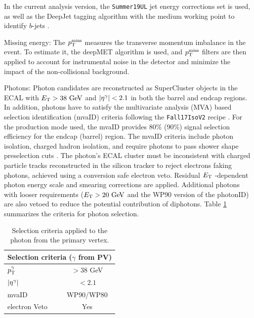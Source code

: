 \begin{myitemlist}
    In the current analysis version, the \verb+Summer19UL+ jet energy corrections set is used, as well as the DeepJet tagging algorithm with the medium working point to identify $b$-jets \cite{Bols:2020bkb}.

    \item[Missing energy:] The $p_\text{T}^{\text{miss}}$ measures the transverse momentum imbalance in the event. To estimate it, the deepMET algorithm \cite{Feng:2744871} is used, and $p_\text{T}^{\text{miss}}$ filters are then applied to account for instrumental noise in the detector and minimize the impact of the non-collisional background.
    
    \item[Photons:] Photon candidates are reconstructed as SuperCluster objects in the ECAL with $E_\text{T} > 38\ \text{GeV}$ and $\left\lvert\eta^{\gamma}\right\rvert < 2.1$ in both the barrel and endcap regions. In addition, photons have to satisfy the multivariate analysis (MVA) based selection identification (mvaID) criteria following the \verb+Fall17IsoV2+ recipe \cite{CMS:2020uim}. For the production mode used, the mvaID provides 80\% (90\%) signal selection efficiency for the endcap (barrel) region. The mvaID criteria include photon isolation, charged hadron isolation, and require photons to pass shower shape preselection cuts \cite{Rembser:2019ijh}. The photon's ECAL cluster must be inconsistent with charged particle tracks reconstructed in the silicon tracker to reject electrons faking photons, achieved using a conversion safe electron veto. Residual $E_\text{T}$ -dependent photon energy scale and smearing corrections are applied. Additional photons with looser requirements ($E_\text{T} > 20\ \text{GeV}$ and the WP90 version of the photonID) are also vetoed to reduce the potential contribution of diphotons. Table \ref{tab:photon_selection} summarizes the criteria for photon selection.

    \begin{table}[!ht]
        \centering
        \begin{tabular}{|l|c|}
            \hline
                \multicolumn{2}{|c|}{\cellcolor{lightgray}Selection criteria ($\gamma$ from PV)}\\ \hline
                $p_\text{T}^{\gamma}$            &$>38$ GeV\\
                $\left\lvert\eta^{\gamma}\right\rvert$       &$<2.1$ \\
                mvaID                       &WP90/WP80 \\
                electron Veto               &Yes \\\hline
            \end{tabular}
        \caption{Selection criteria applied to the photon from the primary vertex.}
        \label{tab:photon_selection}
    \end{table}


\end{myitemlist}
